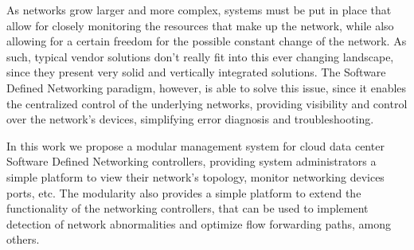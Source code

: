 \par As networks grow larger and more complex, systems must be put in place that allow for closely monitoring the resources that make up the network, while also 
allowing for a certain freedom for the possible constant change of the network. As such, typical vendor solutions don't really fit into this ever changing landscape,
since they present very solid and vertically integrated solutions. The Software Defined Networking paradigm, however, is able to solve this issue, since it enables
the centralized control of the underlying networks, providing visibility and control over the network's devices, simplifying error diagnosis and troubleshooting. 

\par In this work we propose a modular management system for cloud data center Software Defined Networking controllers, providing system administrators a simple
platform to view their network's topology, monitor networking devices ports, etc. The modularity also provides a simple platform to extend the functionality 
of the networking controllers, that can be used to implement detection of network abnormalities and optimize flow forwarding paths, among others.
